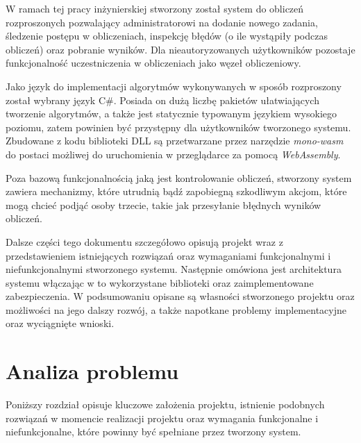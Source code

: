 \documentclass[a4paper,11pt,twoside]{report}
\theoremstyle{definition}
\begin{document}
    W ramach tej pracy inżynierskiej stworzony został system do obliczeń rozproszonych pozwalający
    administratorowi na dodanie nowego zadania, śledzenie postępu w obliczeniach, inspekcję
    błędów (o ile wystąpiły podczas obliczeń) oraz pobranie wyników.
    Dla nieautoryzowanych użytkowników pozostaje funkcjonalność uczestniczenia w obliczeniach jako węzeł obliczeniowy.

    Jako język do implementacji algorytmów wykonywanych w sposób rozproszony został wybrany język C\#.
    Posiada on dużą liczbę pakietów ułatwiających tworzenie algorytmów,
    a także jest statycznie typowanym językiem wysokiego poziomu,
    zatem powinien być przystępny dla użytkowników tworzonego systemu.
    Zbudowane z kodu biblioteki DLL są przetwarzane przez narzędzie \textit{mono-wasm}
    do postaci możliwej do uruchomienia w przeglądarce za pomocą \textit{WebAssembly}.
    
    Poza bazową funkcjonalnością jaką jest kontrolowanie obliczeń, stworzony system zawiera
    mechanizmy, które utrudnią bądź zapobiegną szkodliwym akcjom, które mogą chcieć
    podjąć osoby trzecie, takie jak przesyłanie błędnych wyników obliczeń.
    
    Dalsze części tego dokumentu szczegółowo opisują projekt wraz z przedstawieniem istniejących
    rozwiązań oraz wymaganiami funkcjonalnymi i niefunkcjonalnymi stworzonego systemu.
    Następnie omówiona jest architektura systemu włączając w to wykorzystane biblioteki oraz zaimplementowane zabezpieczenia.
    W podsumowaniu opisane są własności stworzonego projektu oraz możliwości na jego dalszy rozwój, a także napotkane problemy implementacyjne oraz wyciągnięte wnioski.

\chapter{Analiza problemu}
    \label{analiza-problemu}

    Poniższy rozdział opisuje kluczowe założenia projektu, istnienie podobnych rozwiązań w momencie realizacji projektu oraz wymagania funkcjonalne i niefunkcjonalne, które powinny być spełniane przez tworzony system.
\end{document}

